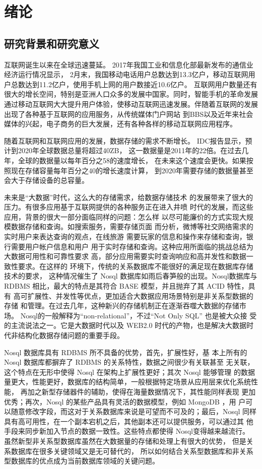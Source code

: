 
\chapter{绪论}
\section{研究背景和研究意义}
互联网诞生以来在全球迅速蔓延。
2017年我国工业和信息化部最新发布的通信业经济运行情况显示，
2月末，我国移动电话用户总数达到13.3亿户，移动互联网用户总数达到11.2亿户，使用手机上网的用户数接近10.6亿户。
互联网用户数量还有很大的增长空间，特别是亚洲人口众多的发展中国家。同时，智能手机的革命发展
通过移动互联网大大提升用户体验，使移动互联网迅速发展。伴随着互联网的发展
出现了各种基于互联网的应用服务，从传统媒体门户网站
到BBS以及近年来社会媒体的兴起，电子商务的巨大发展，还有各种各样的移动互联网应用程序。

随着互联网和互联网应用的发展，数据存储的需求不断增长。
IDC报告显示，预计到2020年全球数据总量将超过40ZB，
这一数据量是2011年的22倍。在过去几年，全球的数据量以每年百分之58的速度增长，
在未来这个速度会更快。如果按照现在存储容量每年百分之40的增长速度计算，
到2020年需要存储的数据量甚至会大于存储设备的总容量。

未来是“大数据”时代，这么大的存储需求，给数据存储技术
的发展带来了很大的压力。有很多应用基于互联网提供的各种服务正在进入井喷
时代的发展，而这些应用，背景的很大一部分面临同样的问题：怎么样
以尽可能廉价的方式实现大规模数据存储和查询。如搜索服务，需要存储页面
而分析，微博等社交网络需求的实时用户来表达查询的观点，在线旅游
需要玩家的信息和操作来存储和查询，银行需要用户帐户信息和用户
用于实时存储和查询。这种应用所面临的挑战总结为大数据可用性和可靠性要求
高，部分应用需要实时查询响应和高并发性和数据一致性要求。在这样的
环境下，传统的关系数据库不能很好的满足现在数据库存储技术的要求，
这种情况催生了 Nosql 数据库如雨后春笋般的出现。Nosql数据库与
RDBMS 相比，最大的特点是其符合 BASE 模型，并且抛弃了其 ACID 特性，具有
高可扩展性、并发性等优点，更加适合大数据应用场景特别是非关系型数据的存储
和管理。在过去几年，这种新兴的存储机制正在逐渐吞噬大数据的存储市场。
Nosql的一般解释为“non-relational”，不过“Not Only SQL” 也是被大众接
受的主流说法之一。它是大数据时代以及 WEB2.0 时代的产物，也是解决大数据时
代非结构化数据存储问题的重要手段。

Nosql 数据库具有 RDBMS 所不具备的优势，首先，扩展性好，基
本上所有的 Nosql 数据库都摒弃了 RDBMS 的关系特性，数据之间很少有关联甚至
无关联，这个特点在无形中使得 Nosql 在架构上扩展性更好；其次 Nosql 能够管理
的数据量更大，性能更好，数据库的结构简单，一般根据特定场景从应用层来优化系统性能，
再加之新型存储器件的辅助，使得在海量数据情况下，其性能同样表现
更加优秀；再次，Nosql 的某些产品具有灵活的数据模型，例如 MongoDB  ，用
户可以随意修改字段，而这对于关系数据库来说是可望而不可及的；最后，Nosql
同样具有高可用性，在一个副本宕机之后，其他副本还可以提供服务，可以通过其
他手段来同步新加入节点的数据一致性。这些特点都使得 Nosql变得越来越流行。
虽然新型非关系型数据库虽然在大数据量的存储和处理上有很大的优势，
但是关系数据库在很多关键领域又是无可替代的，
所以如何结合关系型数据库和非关系型数据库的优点成为当前数据库领域的关键问题。

